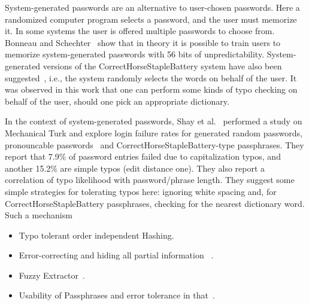 System-generated passwords are an alternative to user-chosen passwords. Here a
randomized computer program selects a password, and the user must memorize it.
In some systems the user is offered multiple passwords to choose from.  Bonneau
and Schechter~\cite{bonneau2014towards} show that in theory it is possible to
train users to memorize system-generated passwords with 56 bits of
unpredictability.  System-generated versions of the CorrectHorseStapleBattery
system have also been suggested~\cite{shay2012correct}, i.e., the system
randomly selects the words on behalf of the user. It was observed in this work
that one can perform some kinds of typo checking on behalf of the user, should
one pick an appropriate dictionary.

In the context of system-generated passwords,  Shay et
al.~\cite{shay2012correct} performed a study on Mechanical Turk and explore login
failure rates for generated random passwords, pronouncable passwords~\cite{gasser1975random} and
CorrectHorseStapleBattery-type passphrases. They report that
7.9\% of password entries failed due to capitalization typos, and another
15.2\% are simple typos (edit distance one). They also report a correlation of
typo likelihood with password/phrase length.
They suggest some simple strategies for tolerating typos here:
ignoring white spacing and, for CorrectHorseStapleBattery passphrases, checking
for the nearest dictionary word. Such a mechanism



\begin{itemize}
\item Typo tolerant order independent Hashing.~\cite{bard2007spelling}
\item Error-correcting and hiding all partial information ~\cite{1543961}.
\item Fuzzy Extractor~\cite{dodisetal:2004,juelswattenberg:1999}.
\item Usability of Passphrases and error tolerance in that~\cite{shay2012correct}.
\end{itemize}




